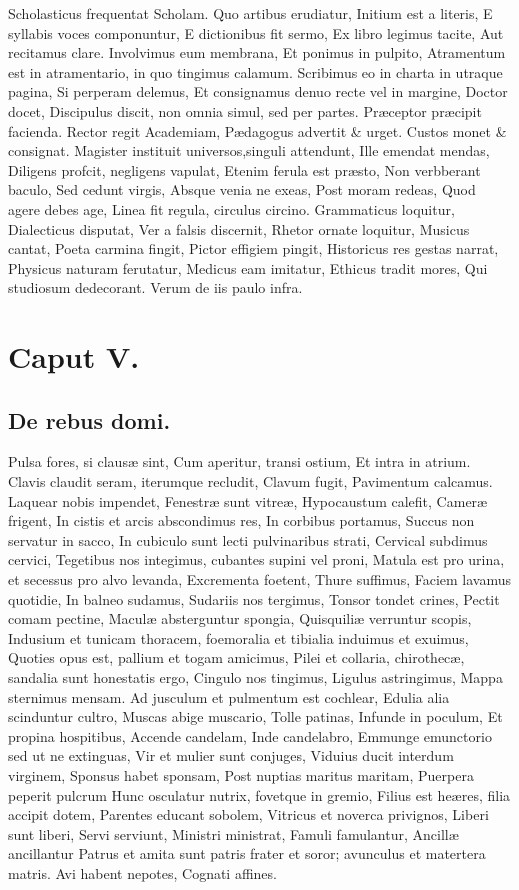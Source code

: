 \documentclass{book}
\begin{document}
Scholasticus frequentat Scholam.
Quo artibus erudiatur,
Initium est a literis,
E syllabis voces componuntur,
E dictionibus fit sermo,
Ex libro legimus tacite,
Aut recitamus clare.
Involvimus eum membrana,
Et ponimus in pulpito,
Atramentum est in atramentario, in quo tingimus calamum.
Scribimus eo in charta in utraque pagina,
Si perperam delemus,
Et consignamus denuo recte vel in margine,
Doctor docet,
Discipulus discit, non omnia simul, sed per partes.
Præceptor præcipit facienda.
Rector regit Academiam,
Pædagogus advertit & urget.
Custos monet & consignat.
Magister instituit universos,singuli attendunt,
Ille emendat mendas,
Diligens profcit, negligens vapulat,
Etenim ferula est præsto,
Non verbberant baculo,
Sed cedunt virgis,
Absque venia ne exeas,
Post moram redeas,
Quod agere debes age,
Linea fit regula, circulus circino.
Grammaticus loquitur,
Dialecticus disputat,
Ver a falsis discernit,
Rhetor ornate loquitur,
Musicus cantat,
Poeta carmina fingit,
Pictor effigiem pingit,
Historicus res gestas narrat,
Physicus naturam ferutatur,
Medicus eam imitatur,
Ethicus tradit mores,
Qui studiosum dedecorant.
Verum de iis paulo infra.


\chapter{Caput V.}

\section{De rebus domi.}

Pulsa fores, si clausæ sint,
Cum aperitur, transi ostium,
Et intra in atrium.
Clavis claudit seram, iterumque recludit,
Clavum fugit,
Pavimentum calcamus. 
Laquear nobis impendet,
Fenestræ sunt vitreæ,
Hypocaustum calefit,
Cameræ frigent,
In cistis et arcis abscondimus res,
In corbibus portamus,
Succus non servatur in sacco,
In cubiculo sunt lecti pulvinaribus strati, 
Cervical subdimus cervici,
Tegetibus nos integimus, cubantes supini vel proni,
Matula est pro urina, et secessus pro alvo levanda,
Excrementa foetent,
Thure suffimus,
Faciem lavamus quotidie,
In balneo sudamus,
Sudariis nos tergimus,
Tonsor tondet crines,
Pectit comam pectine,
Maculæ absterguntur spongia,
Quisquiliæ verruntur scopis,
Indusium et tunicam thoracem, foemoralia et tibialia induimus et exuimus,
Quoties opus est, pallium et togam amicimus,
Pilei et collaria, chirothecæ, sandalia sunt honestatis ergo,
Cingulo nos tingimus,
Ligulus astringimus,
Mappa sternimus mensam.
Ad jusculum et pulmentum est cochlear,
Edulia alia scinduntur cultro,
Muscas abige muscario,
Tolle patinas,
Infunde in poculum,
Et propina hospitibus,
Accende candelam,
Inde candelabro,
Emmunge emunctorio sed ut ne extinguas,
Vir et mulier sunt conjuges,
Viduius ducit interdum virginem,
Sponsus habet sponsam,
Post nuptias maritus maritam,
Puerpera peperit pulcrum
Hunc osculatur nutrix, fovetque in gremio,
Filius est heæres, filia accipit dotem,
Parentes educant sobolem,
Vitricus et noverca privignos,
Liberi sunt liberi,
Servi serviunt,
Ministri ministrat,
Famuli famulantur,
Ancillæ ancillantur
Patrus et amita sunt patris frater et soror; avunculus et matertera matris.
Avi habent nepotes,
Cognati affines.
\end{document}
